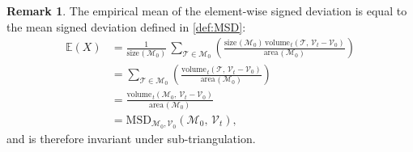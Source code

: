 \documentclass{article}
\theoremstyle{definition}
\newtheorem{remark}{Remark}
\newcommand{\EE}{\mathbb{E}}
\newcommand{\MM}{\mathcal{M}}
\newcommand{\VV}{\mathcal{V}}
\newcommand{\TT}{\mathcal{T}}
\newcommand{\area}{\mathrm{area}\hspace{1pt}}
\newcommand{\size}{\mathrm{size}\hspace{1pt}}
\newcommand{\vol}{\mathrm{volume\hspace{1pt}}}
\begin{document}
\begin{remark}
The empirical mean of the element-wise signed deviation is equal to the mean signed deviation defined in
\ref{def:MSD}:
\begin{align*}
\EE(X) & = \frac{1}{\size(\MM_0)}\,\sum_{\TT\in\MM_0}
 \left(\frac{\size(\MM_0)\,\vol_t(\TT,\,\VV_t-\VV_0)}{\area(\MM_0)}\right) \\
 & = \sum_{\TT\in\MM_0}\left(\frac{\vol_t(\TT,\,\VV_t-\VV_0)}{\area(\MM_0)}\right) \\
 & = \frac{\vol_t(\MM_0,\,\VV_t-\VV_0)}{\area(\MM_0)}\\
 & = \mathrm{MSD}_{\MM_0,\VV_0} (\MM_0,\,\VV_t),
\end{align*}
and is therefore invariant under sub-triangulation.
\end{remark}


% 
% 
%
\end{document}
